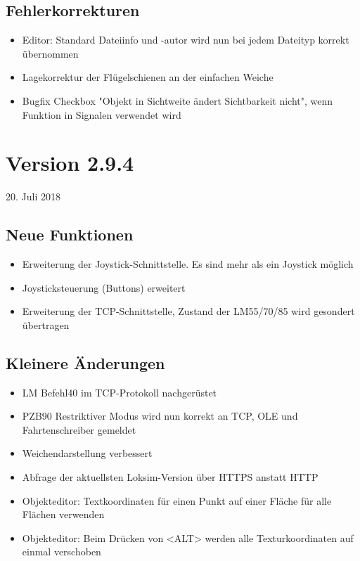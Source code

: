 \subsection{Fehlerkorrekturen}
\begin{itemize}
\item Editor: Standard Dateiinfo und -autor wird nun bei jedem Dateityp korrekt übernommen
\item Lagekorrektur der Flügelschienen an der einfachen Weiche
\item Bugfix Checkbox "Objekt in Sichtweite ändert Sichtbarkeit nicht", wenn Funktion in Signalen verwendet wird
\end{itemize}


\section{Version 2.9.4}\hfill 20. Juli 2018
\subsection{Neue Funktionen}
\begin{itemize}
\item Erweiterung der Joystick-Schnittstelle. Es sind mehr als ein Joystick möglich
\item Joysticksteuerung (Buttons) erweitert
\item Erweiterung der TCP-Schnittstelle, Zustand der LM55/70/85 wird gesondert übertragen
\end{itemize}


\subsection{Kleinere Änderungen}
\begin{itemize}
\item LM Befehl40 im TCP-Protokoll nachgerüstet
\item PZB90 Restriktiver Modus wird nun korrekt an TCP, OLE und Fahrtenschreiber gemeldet
\item Weichendarstellung verbessert
\item Abfrage der aktuellsten Loksim-Version über HTTPS anstatt HTTP
\item Objekteditor: Textkoordinaten für einen Punkt auf einer Fläche für alle Flächen verwenden
\item Objekteditor: Beim Drücken von <ALT> werden alle Texturkoordinaten auf einmal verschoben
\end{itemize}


